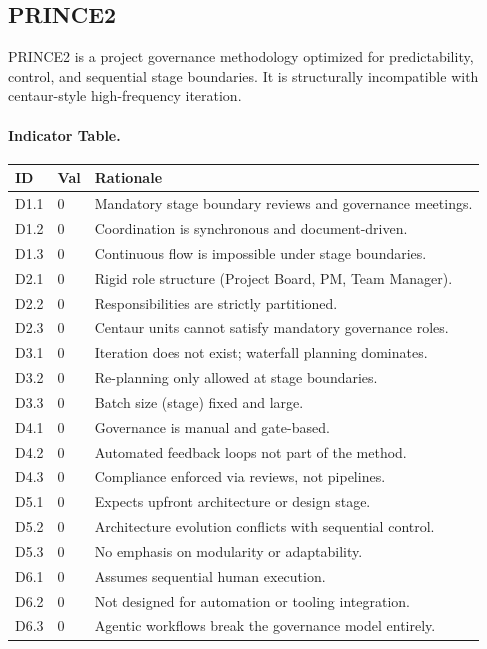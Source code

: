 \documentclass[11pt, a4paper, twocolumn]{article} %
\begin{document}
\newpage
\subsection*{PRINCE2}

PRINCE2 \citep{OGC2009prince2} is a project governance methodology optimized for
predictability, control, and sequential stage boundaries. It is structurally
incompatible with centaur-style high-frequency iteration.

\paragraph{Indicator Table.}

\begin{table}[h]
\centering
\begin{tabular}{llp{10.5cm}}
\toprule
\textbf{ID} & \textbf{Val} & \textbf{Rationale} \\
\midrule
D1.1 & 0 & Mandatory stage boundary reviews and governance meetings. \\
D1.2 & 0 & Coordination is synchronous and document-driven. \\
D1.3 & 0 & Continuous flow is impossible under stage boundaries. \\
\midrule
D2.1 & 0 & Rigid role structure (Project Board, PM, Team Manager). \\
D2.2 & 0 & Responsibilities are strictly partitioned. \\
D2.3 & 0 & Centaur units cannot satisfy mandatory governance roles. \\
\midrule
D3.1 & 0 & Iteration does not exist; waterfall planning dominates. \\
D3.2 & 0 & Re-planning only allowed at stage boundaries. \\
D3.3 & 0 & Batch size (stage) fixed and large. \\
\midrule
D4.1 & 0 & Governance is manual and gate-based. \\
D4.2 & 0 & Automated feedback loops not part of the method. \\
D4.3 & 0 & Compliance enforced via reviews, not pipelines. \\
\midrule
D5.1 & 0 & Expects upfront architecture or design stage. \\
D5.2 & 0 & Architecture evolution conflicts with sequential control. \\
D5.3 & 0 & No emphasis on modularity or adaptability. \\
\midrule
D6.1 & 0 & Assumes sequential human execution. \\
D6.2 & 0 & Not designed for automation or tooling integration. \\
D6.3 & 0 & Agentic workflows break the governance model entirely. \\
\bottomrule
\end{tabular}
\end{table}
\end{document}
